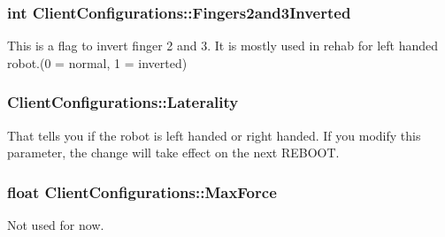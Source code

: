 \subsubsection[{\texorpdfstring{Fingers2and3\+Inverted}{Fingers2and3Inverted}}]{\setlength{\rightskip}{0pt plus 5cm}int Client\+Configurations\+::\+Fingers2and3\+Inverted}\hypertarget{struct_client_configurations_a55cb748c864cd65d8136da316b46df61}{}\label{struct_client_configurations_a55cb748c864cd65d8136da316b46df61}


This is a flag to invert finger 2 and 3. It is mostly used in rehab for left handed robot.(0 = normal, 1 = inverted) 

\subsubsection[{\texorpdfstring{Laterality}{Laterality}}]{ Client\+Configurations\+::\+Laterality}\hypertarget{struct_client_configurations_ac5eae96db1727c1330a987f49acadb0f}{}\label{struct_client_configurations_ac5eae96db1727c1330a987f49acadb0f}


That tells you if the robot is left handed or right handed. If you modify this parameter, the change will take effect on the next R\+E\+B\+O\+OT. 

\subsubsection[{\texorpdfstring{Max\+Force}{MaxForce}}]{\setlength{\rightskip}{0pt plus 5cm}float Client\+Configurations\+::\+Max\+Force}\hypertarget{struct_client_configurations_a9c68b6f56291d1be104928f7db071579}{}\label{struct_client_configurations_a9c68b6f56291d1be104928f7db071579}


Not used for now. 

